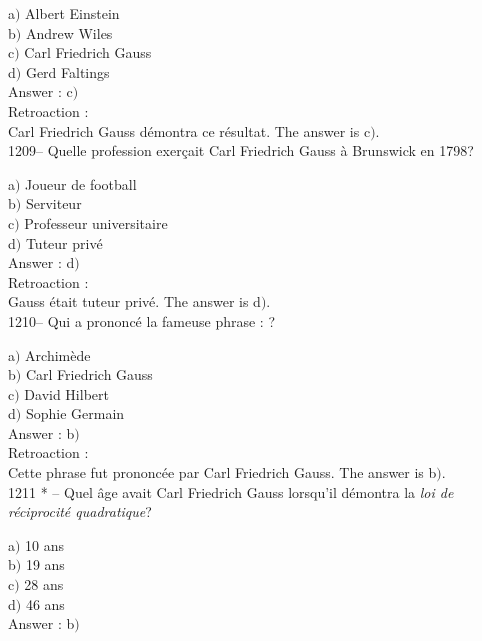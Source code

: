 ﻿\documentclass[letterpaper, 12pt]{article}
\begin{document}
a$)$ Albert Einstein\\
b$)$ Andrew Wiles \\
c$)$ Carl Friedrich Gauss \\
d$)$ Gerd Faltings \\

Answer : c$)$\\

Retroaction : \\
Carl Friedrich Gauss d\'emontra ce r\'esultat.
The answer is c$)$.\\

1209-- Quelle profession exer\c cait Carl Friedrich Gauss \`a
Brunswick en 1798?

a$)$ Joueur de football\\
b$)$ Serviteur \\
c$)$ Professeur universitaire \\
d$)$ Tuteur priv\'e \\

Answer : d$)$\\

Retroaction : \\
Gauss \'etait tuteur priv\'e.
The answer is d$)$.\\

1210-- Qui a prononc\'e la fameuse phrase : \fg ?

a$)$ Archim\`ede \\
b$)$ Carl Friedrich Gauss \\
c$)$ David Hilbert \\
d$)$ Sophie Germain\\

Answer : b$)$\\

Retroaction : \\
Cette phrase fut prononc\'ee par Carl Friedrich Gauss.
The answer is b$)$.\\

1211 * -- Quel \^age avait Carl Friedrich Gauss lorsqu'il d\'emontra
la {\sl loi de r\'eciprocit\'e quadratique}?

a$)$ 10 ans \\
b$)$ 19 ans \\
c$)$ 28 ans \\
d$)$ 46 ans\\

Answer : b$)$\\
\end{document}
